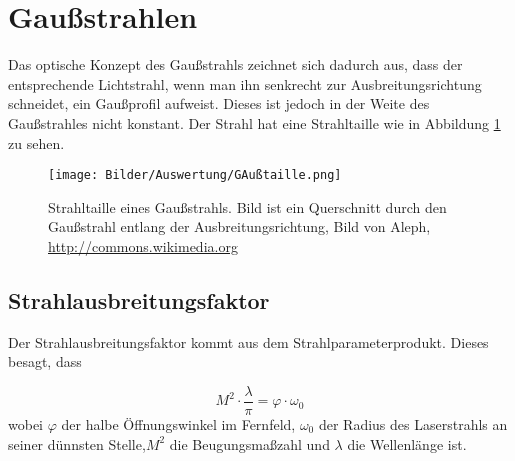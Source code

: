 \section{Gaußstrahlen}
\label{section:Gaussian}

Das optische Konzept des Gaußstrahls zeichnet sich dadurch aus, dass der entsprechende Lichtstrahl, 
wenn man ihn senkrecht zur Ausbreitungsrichtung schneidet, ein Gaußprofil aufweist.
Dieses ist jedoch in der Weite des Gaußstrahles nicht konstant. Der Strahl hat eine 
Strahltaille wie in Abbildung \ref{bild:taille} zu sehen.

\begin{figure}[ht]
    \centering
    \texttt{[image: Bilder/Auswertung/GAußtaille.png]}
    \caption{Strahltaille eines Gaußstrahls. Bild ist ein Querschnitt durch den Gaußstrahl entlang der Ausbreitungsrichtung, 
    Bild von Aleph, \url{http://commons.wikimedia.org}}
    \label{bild:taille}
\end{figure}

\subsection{Strahlausbreitungsfaktor}

Der Strahlausbreitungsfaktor kommt aus dem Strahlparameterprodukt. Dieses besagt, dass 

\begin{equation*}
    M^2 \cdot \frac{\lambda}{\pi} = \varphi \cdot \omega_0
\end{equation*}
wobei $\varphi$ der halbe Öffnungswinkel im Fernfeld, $\omega_0$ der Radius des Laserstrahls an seiner dünnsten Stelle,$M^2$ die Beugungsmaßzahl
und $\lambda$ die Wellenlänge ist.